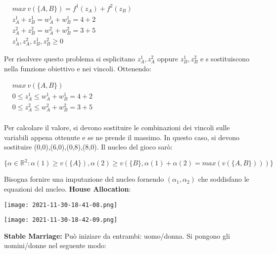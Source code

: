 \documentclass{article}
\theoremstyle{definition}
\theoremstyle{remark}
\begin{document}
\begin{center}
    $\begin{aligned}
        & max\ v(\{A,B\})= f^1(z_A)+f^2(z_B)\\
        & z_A^1+z_B^1=w_A^1+w_B^1=4+2\\
        & z_A^2+z_B^2=w_A^2+w_B^2=3+5\\
        & z_A^1,z_A^2,z_B^1,z_B^2\geq 0
    \end{aligned}$
\end{center}
Per risolvere questo problema si esplicitano \(z_A^1,z_A^2\) oppure \(z_B^1,z_B^2\) e s sostituiscono nella funzione obiettivo e nei vincoli. Ottenendo:
\begin{center}
    $\begin{aligned}
        & max\ v(\{A,B\})\\
        & 0\leq z_A^1\leq w_A^1+w_B^1=4+2\\
        & 0\leq z_A^2\leq w_A^2+w_B^2=3+5\\
    \end{aligned}$
\end{center}
Per calcolare il valore, si devono sostituire le combinazioni dei vincoli sulle variabili appena ottenute e se ne prende il massimo.\newline
In questo caso, si devono sostituire (0,0),(6,0),(0,8),(8,0).\newline
Il nucleo del gioco sarò:
\begin{center}
    \(\{\alpha\in\mathbb{R}^2:\alpha(1)\geq v(\{A\}),\alpha(2)\geq v(\{B\},\alpha(1)+\alpha(2)=max(v(\{A,B\})))\}\)
\end{center}
Bisogna fornire una imputazione del nucleo fornendo \((\alpha_1,\alpha_2)\) che soddisfano le equazioni del nucleo.\newline
\textbf{House Allocation}:
\newline
\begin{center}
    \texttt{[image: 2021-11-30-18-41-08.png]}
\end{center}
\begin{center}
    \texttt{[image: 2021-11-30-18-42-09.png]}
\end{center}
\textbf{Stable Marriage:} Può iniziare da entrambi: uomo/donna. Si pongono gli uomini/donne nel seguente modo:
\end{document}
